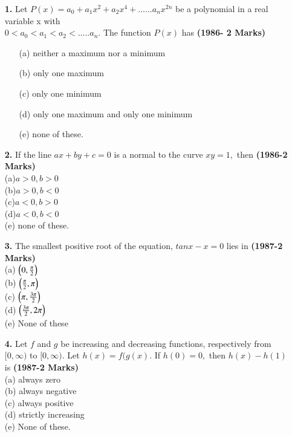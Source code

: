 \documentclass[journal,12pt,twocolumn]{IEEEtran}
\theoremstyle{remark}
\begin{document}
 \begin{enumerate}
     \item [\textbf{1.}] Let $P(x) = a_0+ a_1x^2+a_2x^4+......a_nx^{2n}$ be a polynomial in a real variable x with \\
     $0<a_0<a_1<a_2<.....a_n.$ The function $P(x)$ has 
     \hfill{\textbf{(1986- 2 Marks)}}
      \begin{enumerate}

   \item[(a)] neither a maximum nor a minimum
 
   \item[(b)] only one maximum

   \item[(c)] only one minimum

   \item [(d)] only one maximum and only one minimum
   
   \item[(e)] none of these.\\

\end{enumerate} 

\item[\textbf{2.}] If the line $ax+by+c = 0$ is a normal to the curve $xy=1,$ then 
\hfill{\textbf{(1986-2 Marks)}}\\
 (a)$a>0,b>0$ \\
 (b)$a>0,b<0$ \\
 (c)$a<0,b>0$\\
 (d)$a<0,b<0$\\
 (e) none of these.\\

\item[\textbf{3.} ] The smallest positive root of the equation, $tanx-x=0$ lies in 
\hfill{\textbf{(1987-2 Marks)}}\\
 (a) $\left(0,\frac{\pi}{2}\right)$\\
 (b) $\left(\frac{\pi}{2},\pi\right)$\\
 (c) $\left(\pi,\frac{3\pi}{2}\right)$\\
 (d) $\left(\frac{3\pi}{2},2\pi\right)$\\
 (e) None of these\\

 \item[\textbf{4.}] Let $f$ and $g$ be increasing and decreasing functions, respectively from $[0,\infty)$ to $[0,\infty)$. Let $h(x) = f(g(x).$ If $h(0) = 0,$ then $h(x)-h(1)$ is
 \hfill{\textbf{(1987-2 Marks)}}\\
 (a) always zero\\
 (b) always negative\\
 (c) always positive\\
 (d) strictly increasing\\
 (e) None of these.\\


\end{enumerate}
\end{document}
